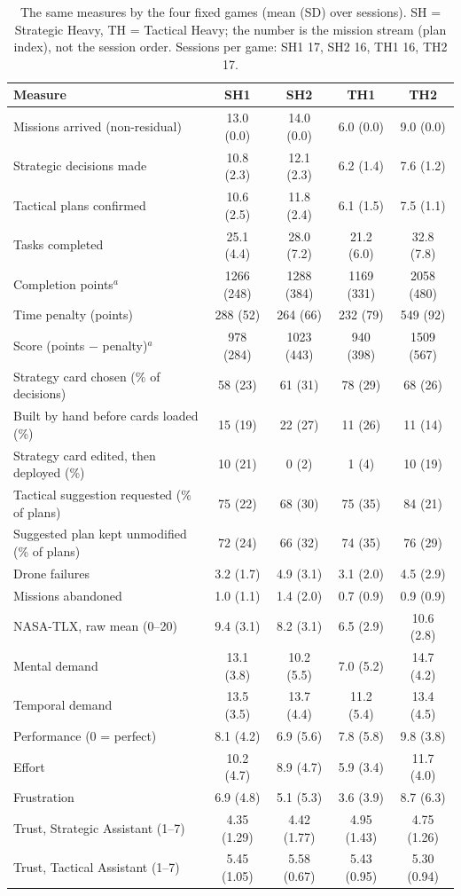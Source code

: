 \begin{table}[htbp]
\centering
\footnotesize
\caption{The same measures by the four fixed games (mean (SD) over sessions). SH = Strategic Heavy, TH = Tactical Heavy; the number is the mission stream (plan index), not the session order. Sessions per game: SH1 17, SH2 16, TH1 16, TH2 17.}
\label{tab:games}
\begin{tabular}{lcccc}
\toprule
\textbf{Measure} & \textbf{SH1} & \textbf{SH2} & \textbf{TH1} & \textbf{TH2} \\
\midrule
Missions arrived (non-residual) & 13.0 (0.0) & 14.0 (0.0) & 6.0 (0.0) & 9.0 (0.0) \\
Strategic decisions made & 10.8 (2.3) & 12.1 (2.3) & 6.2 (1.4) & 7.6 (1.2) \\
Tactical plans confirmed & 10.6 (2.5) & 11.8 (2.4) & 6.1 (1.5) & 7.5 (1.1) \\
Tasks completed & 25.1 (4.4) & 28.0 (7.2) & 21.2 (6.0) & 32.8 (7.8) \\
Completion points$^a$ & 1266 (248) & 1288 (384) & 1169 (331) & 2058 (480) \\
Time penalty (points) & 288 (52) & 264 (66) & 232 (79) & 549 (92) \\
Score (points $-$ penalty)$^a$ & 978 (284) & 1023 (443) & 940 (398) & 1509 (567) \\
Strategy card chosen (\% of decisions) & 58 (23) & 61 (31) & 78 (29) & 68 (26) \\
Built by hand before cards loaded (\%) & 15 (19) & 22 (27) & 11 (26) & 11 (14) \\
Strategy card edited, then deployed (\%) & 10 (21) & 0 (2) & 1 (4) & 10 (19) \\
Tactical suggestion requested (\% of plans) & 75 (22) & 68 (30) & 75 (35) & 84 (21) \\
Suggested plan kept unmodified (\% of plans) & 72 (24) & 66 (32) & 74 (35) & 76 (29) \\
Drone failures & 3.2 (1.7) & 4.9 (3.1) & 3.1 (2.0) & 4.5 (2.9) \\
Missions abandoned & 1.0 (1.1) & 1.4 (2.0) & 0.7 (0.9) & 0.9 (0.9) \\
NASA-TLX, raw mean (0--20) & 9.4 (3.1) & 8.2 (3.1) & 6.5 (2.9) & 10.6 (2.8) \\
\quad Mental demand & 13.1 (3.8) & 10.2 (5.5) & 7.0 (5.2) & 14.7 (4.2) \\
\quad Temporal demand & 13.5 (3.5) & 13.7 (4.4) & 11.2 (5.4) & 13.4 (4.5) \\
\quad Performance (0 = perfect) & 8.1 (4.2) & 6.9 (5.6) & 7.8 (5.8) & 9.8 (3.8) \\
\quad Effort & 10.2 (4.7) & 8.9 (4.7) & 5.9 (3.4) & 11.7 (4.0) \\
\quad Frustration & 6.9 (4.8) & 5.1 (5.3) & 3.6 (3.9) & 8.7 (6.3) \\
Trust, Strategic Assistant (1--7) & 4.35 (1.29) & 4.42 (1.77) & 4.95 (1.43) & 4.75 (1.26) \\
Trust, Tactical Assistant (1--7) & 5.45 (1.05) & 5.58 (0.67) & 5.43 (0.95) & 5.30 (0.94) \\
\bottomrule
\end{tabular}
\end{table}
